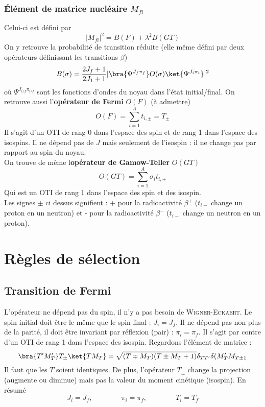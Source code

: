 \subsubsection{Élément de matrice nucléaire $M_{fi}$}
Celui-ci est défini par
\begin{equation}
|M_{fi}|^2 = B(F)+\lambda^2B(GT)
\end{equation}
On y retrouve la probabilité de transition réduite (elle même défini par deux opérateurs définissant les 
transitions $\beta$)
\begin{equation}
B(\sigma) = \dfrac{2J_f+1}{2J_1+1}|\bra{\Psi^{J_f\pi_f}}O(\sigma)\ket{\Psi^{J_i\pi_i}}|^2
\end{equation}
où $\Psi^{J_{i/f}\pi_{i/f}}$ sont les fonctions d'ondes du noyau dans l'état initial/final. On retrouve
aussi l'\textbf{opérateur de Fermi} $O(F)$ (à admettre)
\begin{equation}
O(F) = \sum_{i=1}^A t_{i,\pm} = T_\pm
\end{equation}
Il s'agit d'un OTI de rang 0 dans l'espace des spin et de rang 1 dans l'espace des isospins. Il ne dépend 
pas de $J$ mais seulement de l'isospin : il ne change pas par rapport au spin du noyau.\\

On trouve de même l\textbf{opérateur de Gamow-Teller} $O(GT)$
\begin{equation}
O(GT) = \sum_{i=1}^A \sigma_i t_{i,\pm}
\end{equation}
Qui est un OTI de rang 1 dans l'espace des spin et des isospin.\\

Les signes $\pm$ ci dessus signifient : + pour la radioactivité $\beta^+$ ($t_{i+}$ change un proton en un 
neutron) et - pour la radioactivité $\beta^-$ ($t_{i-}$ change un neutron en un proton).


\section{Règles de sélection}
\subsection{Transition de Fermi}
L'opérateur ne dépend pas du spin, il n'y a pas besoin de \textsc{Wigner-Eckaert}. Le spin initial doit
être le même que le spin final : $J_i=J_f$. Il ne dépend pas non plus de la parité, il doit être invariant
par réflexion (pair) : $\pi_i=\pi_f$. Il s'agit par contre d'un OTI de rang 1 dans l'espace des isospin. 
Regardons l'élément de matrice :
\begin{equation}
\bra{T'M_T'}T_\pm\ket{TM_T} = \sqrt{(T\mp M_T)(T\pm M_T+1)}\delta_{TT'}\delta(M_T'M_{T\pm1}
\end{equation}
Il faut que les $T$ soient identiques. De plus, l'opérateur $T_\pm$ change la projection (augmente ou diminue) 
mais pas la valeur du moment cinétique (isospin). En résumé
\begin{equation}
J_i=J_f,\qquad\qquad \pi_i=\pi_f,\qquad\qquad T_i=T_f
\end{equation}


